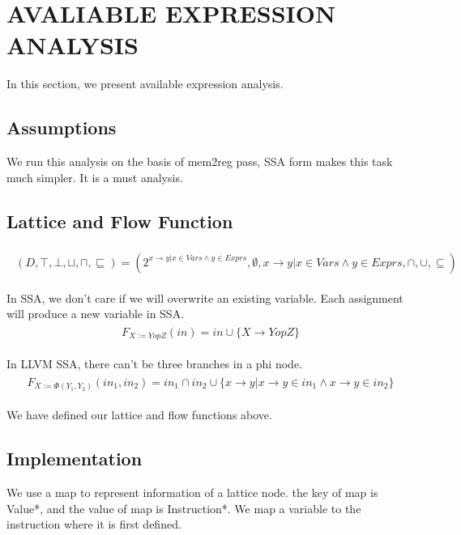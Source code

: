 \section{AVALIABLE EXPRESSION ANALYSIS}
In this section, we present available expression analysis.

\subsection{Assumptions}
We run this analysis on the basis of mem2reg pass, SSA form makes this task much simpler. It is a must analysis.

\subsection{Lattice and Flow Function}

\begin{align} 
	\begin{split}
		(D, \top, \bot, \sqcup, \sqcap, \sqsubseteq) = (2^{x \to y | x \in Vars \wedge y \in Exprs}, \emptyset, x \to y | x \in Vars \wedge y \in Exprs, \cap, \cup, \subseteq)
	\end{split}
\end{align}

In SSA, we don't care if we will overwrite an existing variable. Each assignment will produce a new variable in SSA.
\begin{align} 
	\begin{split}
		F_{X := Y op Z}(in) = in  \cup \{ X \to Y op Z \}
	\end{split}
\end{align}

In LLVM SSA, there can't be three branches in a phi node.
\begin{align} 
	\begin{split}
		F_{X := \Phi(Y_1, Y_2)}(in_1, in_2) = in_1 \cap in_2  \cup \{x \to y | x \to y \in in_1 \wedge x \to y \in in_2\}
	\end{split}
\end{align}

We have defined our lattice and flow functions above.

\subsection{Implementation}
We use a map to represent information of a lattice node. the key of map is Value*, and the value of map is Instruction*. We map a variable to the instruction where it is first defined. 

